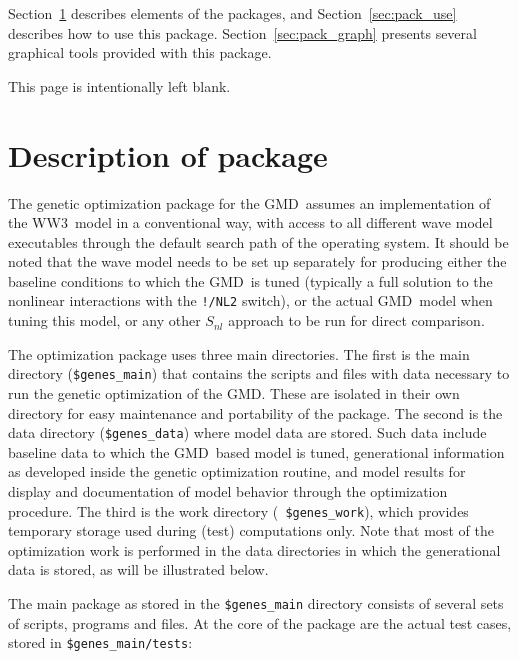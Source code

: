 \documentclass[12pt]{article}
\newcommand{\ws}{WW3}
\newcommand{\gmd}{GMD}
\newcommand{\code}{\tt}
\newcommand{\pb}{\strut \vfill \pagebreak}
\newcommand{\bpage}{\vfill \pagebreak \strut

\vspace{2.5in} \centerline{This page is intentionally left blank.}}
\newcommand{\newsec}{\setcounter{equation}{0}
                      \setcounter{myfigno}{0}
                      \setcounter{mytabno}{0}}
\newcounter{myfigno}[section]
\newcounter{mytabno}[section]
\begin{document}
Section~\ref{sec:pack_desc} describes elements of the packages, and
Section~\ref{sec:pack_use} describes how to use this package.
Section~\ref{sec:pack_graph} presents several graphical tools provided with
this package.


\bpage
\pb
\section{Description of package} \label{sec:pack_desc}
\newsec

The genetic optimization package for the \gmd\ assumes an implementation of
the \ws\ model in a conventional way, with access to all different wave model
executables through the default search path of the operating system. It should
be noted that the wave model needs to be set up separately for producing
either the baseline conditions to which the \gmd\ is tuned (typically a full
solution to the nonlinear interactions with the {\code !/NL2} switch), or the
actual \gmd\ model when tuning this model, or any other $S_{nl}$ approach to
be run for direct comparison.

The optimization package uses three main directories.  The first is the main
directory ({\code \$genes\_main}) that contains the scripts and files with
data necessary to run the genetic optimization of the \gmd. These are isolated
in their own directory for easy maintenance and portability of the package.
The second is the data directory ({\code \$genes\_data}) where model data are
stored. Such data include baseline data to which the \gmd\ based model is
tuned, generational information as developed inside the genetic optimization
routine, and model results for display and documentation of model behavior
through the optimization procedure.  The third is the work directory ({\code
\$genes\_work}), which provides temporary storage used during (test)
computations only. Note that most of the optimization work is performed in the
data directories in which the generational data is stored, as will be
illustrated below.

The main package as stored in the {\code \$genes\_main} directory consists of
several sets of scripts, programs and files. At the core of the package are
the actual test cases, stored in {\code \$genes\_main/tests}:
\end{document}

